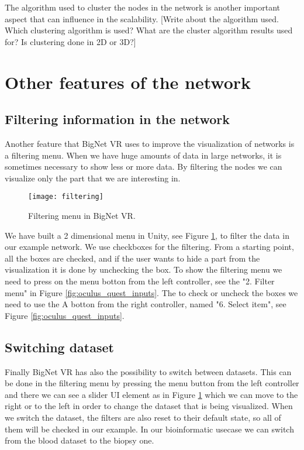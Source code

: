 The algorithm used to cluster the nodes in the network is another important aspect that can influence in the scalability.
[Write about the algorithm used. Which clustering algorithm is used? What are the cluster algorithm results used for? Is clustering done in 2D or 3D?]


\section{Other features of the network}

\subsection{Filtering information in the network}
Another feature that BigNet VR uses to improve the visualization of networks is a filtering menu. When we have huge amounts of data in large networks, it is sometimes necessary to show less or more data. By filtering the nodes we can visualize only the part that we are interesting in.


\begin{figure}[h!]
    \centering%
    \texttt{[image: filtering]}
    \caption{Filtering menu in BigNet VR.}
    \label{fig:filtering}
\end{figure}%


We have built a 2 dimensional menu in Unity, see Figure \ref{fig:filtering}, to filter the data in our example network. We use checkboxes for the filtering. From a starting point, all the boxes are checked, and if the user wants to hide a part from the visualization it is done by unchecking the box. To show the filtering menu we need to press on the menu botton from the left controller, see the "2. Filter menu" in Figure \ref{fig:oculus_quest_inputs}. The to check or uncheck the boxes we need to use the A botton from the right controller, named "6. Select item", see Figure \ref{fig:oculus_quest_inputs}.

\subsection{Switching dataset}
Finally BigNet VR has also the possibility to switch between datasets. This can be done in the filtering menu by pressing the menu button from the left controller and there we can see a slider UI element as in Figure \ref{fig:filtering} which we can move to the right or to the left in order to change the dataset that is being visualized. When we switch the dataset, the filters are also reset to their default state, so all of them will be checked in our example. In our bioinformatic usecase we can switch from the blood dataset to the biopsy one.

